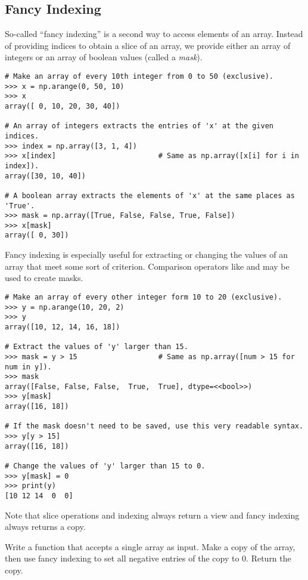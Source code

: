 \subsection*{Fancy Indexing} %

So-called ``fancy indexing'' is a second way to access elements of an array.
Instead of providing indices to obtain a slice of an array, we provide either an array of integers or an array of boolean values (called a \emph{mask}).

\begin{lstlisting}
# Make an array of every 10th integer from 0 to 50 (exclusive).
>>> x = np.arange(0, 50, 10)
>>> x
array([ 0, 10, 20, 30, 40])

# An array of integers extracts the entries of 'x' at the given indices.
>>> index = np.array([3, 1, 4])
>>> x[index]                        # Same as np.array([x[i] for i in index]).
array([30, 10, 40])

# A boolean array extracts the elements of 'x' at the same places as 'True'.
>>> mask = np.array([True, False, False, True, False])
>>> x[mask]
array([ 0, 30])
\end{lstlisting}

Fancy indexing is especially useful for extracting or changing the values of an array that meet some sort of criterion.
Comparison operators like \li{<} and \li{==} may be used to create masks.

\begin{lstlisting}
# Make an array of every other integer form 10 to 20 (exclusive).
>>> y = np.arange(10, 20, 2)
>>> y
array([10, 12, 14, 16, 18])

# Extract the values of 'y' larger than 15.
>>> mask = y > 15                   # Same as np.array([num > 15 for num in y]).
>>> mask
array([False, False, False,  True,  True], dtype=<<bool>>)
>>> y[mask]
array([16, 18])

# If the mask doesn't need to be saved, use this very readable syntax.
>>> y[y > 15]
array([16, 18])

# Change the values of 'y' larger than 15 to 0.
>>> y[mask] = 0
>>> print(y)
[10 12 14  0  0]
\end{lstlisting}

Note that slice operations and indexing always return a view and fancy indexing always returns a copy.

\begin{problem} %
Write a function that accepts a single array as input.
Make a copy of the array, then use fancy indexing to set all negative entries of the copy to $0$.
Return the copy.
\end{problem}

